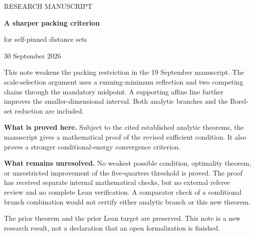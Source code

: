 \documentclass[11pt]{article}
\theoremstyle{definition}\newtheorem{remark}[theorem]{Remark}
\begin{document}
\begin{titlepage}
\vspace*{18mm}
{\large\color{MidnightBlue} RESEARCH MANUSCRIPT}\par
\vspace{8mm}
{\Huge\bfseries A sharper packing criterion}\par
\vspace{5mm}
{\LARGE for self-pinned distance sets}\par
\vspace{12mm}
30 September 2026
\vspace{12mm}

This note weakens the packing restriction in the 19 September manuscript.
The scale-selection argument uses a running-minimum reflection and two competing
chains through the mandatory midpoint. A supporting affine line further improves
the smaller-dimensional interval.
Both analytic branches and the Borel-set reduction are included.

\textbf{What is proved here.} Subject to the cited established analytic theorems,
the manuscript gives a mathematical proof of the revised sufficient condition.
It also proves a stronger conditional-energy convergence criterion.

\textbf{What remains unresolved.} No weakest possible condition, optimality theorem,
or unrestricted improvement of the five-quarters threshold is proved.
The proof has received separate internal mathematical checks, but no external referee
review and no complete Lean verification. A comparator check of a conditional branch
combination would not certify either analytic branch or this new theorem.

\vfill
The prior theorem and the prior Lean target are preserved. This note is a new
research result, not a declaration that an open formalization is finished.
\end{titlepage}
\tableofcontents
\clearpage
\end{document}
